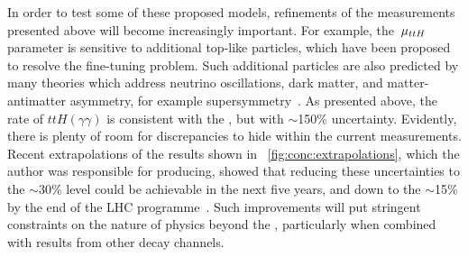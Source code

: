 In order to test some of these proposed models, refinements of the measurements presented above will become increasingly important. 
For example, the $\,\mu_{ttH}$ parameter is sensitive to additional top-like particles, which have been proposed to resolve the fine-tuning problem. Such additional particles are also predicted by many theories which address neutrino oscillations, dark matter, and matter-antimatter asymmetry, for example supersymmetry~\cite{Martin:1997ns}.  
As presented above, the rate of $ttH (\gamma \gamma)$ is consistent with the \SM, but with $\sim$150\% uncertainty. Evidently, there is plenty of room for discrepancies to hide within the current measurements. Recent extrapolations of the \CMS results shown in \Fig~\ref{fig:conc:extrapolations}, which the author was responsible for producing, showed that reducing these uncertainties to the $\sim$30\% level could be achievable in the next five years, and down to the $\sim$15\% by the end of the LHC programme~\cite{CMS-DP-2016-064}. Such improvements will put stringent constraints on the nature of physics beyond the \SM, particularly when combined with results from other decay channels. 
